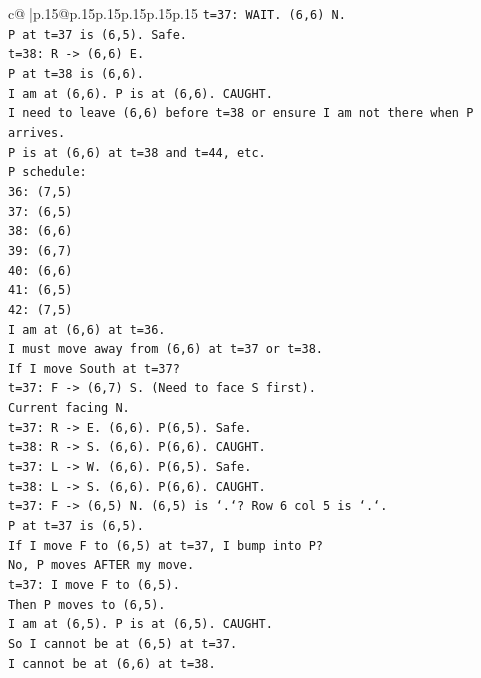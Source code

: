 \documentclass{article}
\begin{document}
{\begin{supertabular}{c@{$\;$}|p{.15\linewidth}@{}p{.15\linewidth}p{.15\linewidth}p{.15\linewidth}p{.15\linewidth}p{.15\linewidth}}
{{{\texttt{t=37: WAIT. (6,6) N.} \\
\texttt{P at t=37 is (6,5). Safe.} \\
\texttt{t=38: R {-}> (6,6) E.} \\
\texttt{P at t=38 is (6,6).} \\
\texttt{I am at (6,6). P is at (6,6). CAUGHT.} \\
\texttt{I need to leave (6,6) before t=38 or ensure I am not there when P arrives.} \\
\texttt{P is at (6,6) at t=38 and t=44, etc.} \\
\texttt{P schedule:} \\
\texttt{36: (7,5)} \\
\texttt{37: (6,5)} \\
\texttt{38: (6,6)} \\
\texttt{39: (6,7)} \\
\texttt{40: (6,6)} \\
\texttt{41: (6,5)} \\
\texttt{42: (7,5)} \\
\texttt{I am at (6,6) at t=36.} \\
\texttt{I must move away from (6,6) at t=37 or t=38.} \\
\texttt{If I move South at t=37?} \\
\texttt{t=37: F {-}> (6,7) S. (Need to face S first).} \\
\texttt{Current facing N.} \\
\texttt{t=37: R {-}> E. (6,6). P(6,5). Safe.} \\
\texttt{t=38: R {-}> S. (6,6). P(6,6). CAUGHT.} \\
\texttt{t=37: L {-}> W. (6,6). P(6,5). Safe.} \\
\texttt{t=38: L {-}> S. (6,6). P(6,6). CAUGHT.} \\
\texttt{t=37: F {-}> (6,5) N. (6,5) is `.`? Row 6 col 5 is `.`.} \\
\texttt{P at t=37 is (6,5).} \\
\texttt{If I move F to (6,5) at t=37, I bump into P?} \\
\texttt{No, P moves AFTER my move.} \\
\texttt{t=37: I move F to (6,5).} \\
\texttt{Then P moves to (6,5).} \\
\texttt{I am at (6,5). P is at (6,5). CAUGHT.} \\
\texttt{So I cannot be at (6,5) at t=37.} \\
\texttt{I cannot be at (6,6) at t=38.} \\
}}}
\end{supertabular}}
\end{document}
